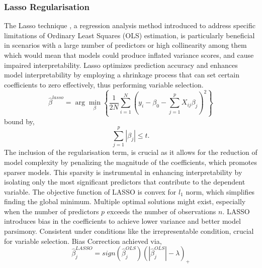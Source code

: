 \subsubsection{Lasso Regularisation}
\noindent The Lasso technique \parencite{tibshirani_regression_1996}, a regression analysis method introduced to address specific limitations of Ordinary Least Squares (OLS) estimation, is particularly beneficial in scenarios with a large number of predictors or high collinearity among them which would mean that models could produce inflated variance scores, and cause impaired interpretability. Lasso optimizes prediction accuracy and enhances model interpretability by employing a shrinkage process that can set certain coefficients to zero effectively, thus performing variable selection.
\begin{equation} \label{eq:lasso}\hat{\beta}^{lasso} = \arg \min_{\beta} \left\{ \frac{1}{2N} \sum_{i=1}^{N} (y_i - \beta_0 - \sum_{j=1}^{p} X_{ij}\beta_j)^2 \right\}\end{equation}
bound by,
\begin{equation} \label{eq:lassobound}\sum_{j=1}^{p} |\beta_j| \leq t.\end{equation}
\noindent \parencite{freijeirogonzalez_critical_2022} The inclusion of the regularisation term, is crucial as it allows for the reduction of model complexity by penalizing the magnitude of the coefficients, which promotes sparser models. This sparsity is instrumental in enhancing interpretability by isolating only the most significant predictors that contribute to the dependent variable. The objective function of LASSO is convex for \(l_{1}\) norm, which simplifies finding the global minimum. Multiple optimal solutions might exist, especially when the number of predictors \(p\) exceeds the number of observations \(n\). \parencite{freijeirogonzalez_critical_2022} LASSO introduces bias in the coefficients to achieve lower variance and better model parsimony. Consistent under conditions like the irrepresentable condition, crucial for variable selection. Bias Correction achieved via,
\begin{equation} \label{eq:lassobais}\hat{\beta}_{j}^{LASSO}=sign(\hat{\beta}_{j}^{OLS})(|\hat{\beta}_{j}^{OLS}| - \lambda)_{+}\end{equation}

